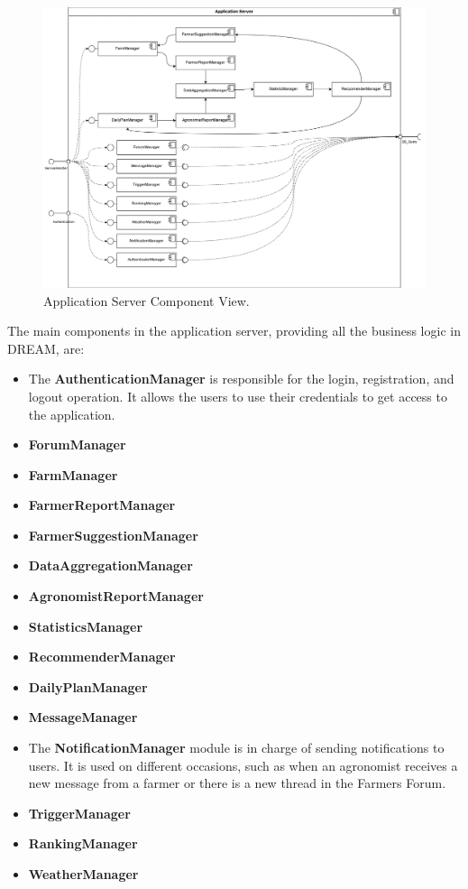 \begin{figure}[hbt!]
\centering
\includegraphics[width=\textwidth]{../images_diagrams/dd/component_only_application.png}
\caption{Application Server Component View.}
\label{fig:ApplicationServerOnlyComp}
\end{figure}

\noindent
The main components in the application server, providing all the business logic in DREAM, are:

\begin{itemize}
	\item The \textbf{AuthenticationManager} is responsible for the login, registration, and logout operation. It allows the users to use their credentials to get access to the application.
	\item \textbf{ForumManager}
	\item \textbf{FarmManager}
	\item \textbf{FarmerReportManager}
	\item \textbf{FarmerSuggestionManager}
	\item \textbf{DataAggregationManager}
	\item \textbf{AgronomistReportManager}
	\item \textbf{StatisticsManager}
	\item \textbf{RecommenderManager}
	\item \textbf{DailyPlanManager}
	\item \textbf{MessageManager}
	\item The \textbf{NotificationManager} module is in charge of sending notifications to users. It is used on different occasions, such as when an agronomist receives a new message from a farmer or there is a new thread in the Farmers Forum.
	\item \textbf{TriggerManager}
	\item \textbf{RankingManager}
	\item \textbf{WeatherManager}
\end{itemize}

